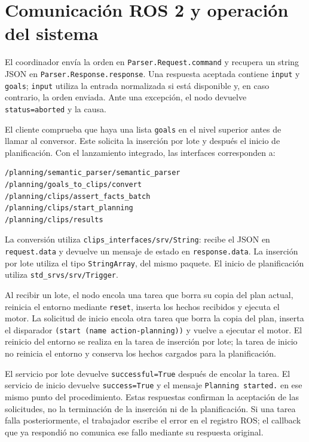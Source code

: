 \section{Comunicación ROS 2 y operación del sistema}

El coordinador envía la orden en \texttt{Parser.\allowbreak Request.\allowbreak command} y
recupera un string JSON en \texttt{Parser.\allowbreak Response.\allowbreak response}.
Una respuesta aceptada contiene \texttt{input} y \texttt{goals};
\texttt{input} utiliza la entrada normalizada si está disponible y,
en caso contrario, la orden enviada. Ante una excepción, el nodo
devuelve \texttt{status=aborted} y la causa.

El cliente comprueba que haya una lista \texttt{goals} en el nivel
superior antes de llamar al conversor. Este solicita la inserción por
lote y después el inicio de planificación. Con el lanzamiento integrado,
las interfaces corresponden a:

\begin{verbatim}
/planning/semantic_parser/semantic_parser
/planning/goals_to_clips/convert
/planning/clips/assert_facts_batch
/planning/clips/start_planning
/planning/clips/results
\end{verbatim}

La conversión utiliza \texttt{clips\_\allowbreak interfaces/\allowbreak srv/\allowbreak String}:
recibe el JSON en \texttt{request.data} y devuelve un mensaje de
estado en \texttt{response.data}. La inserción por lote utiliza el
tipo \texttt{StringArray}, del mismo paquete. El inicio de
planificación utiliza \texttt{std\_\allowbreak srvs/\allowbreak srv/\allowbreak Trigger}.

Al recibir un lote, el nodo encola una tarea que borra su copia del
plan actual, reinicia el entorno mediante \texttt{reset}, inserta
los hechos recibidos y ejecuta el motor. La solicitud de inicio
encola otra tarea que borra la copia del plan, inserta el disparador
\texttt{(start (name action-\allowbreak planning))} y vuelve a ejecutar el motor.
El reinicio del entorno se realiza en la tarea de inserción por lote;
la tarea de inicio no reinicia el entorno y conserva los hechos
cargados para la planificación.

El servicio por lote devuelve \texttt{successful=True} después de
encolar la tarea. El servicio de inicio devuelve
\texttt{success=True} y el mensaje \texttt{Planning started.\allowbreak } en
ese mismo punto del procedimiento. Estas respuestas confirman la
aceptación de las solicitudes, no la terminación de la inserción ni
de la planificación. Si una tarea falla posteriormente, el trabajador
escribe el error en el registro ROS; el callback que ya respondió no
comunica ese fallo mediante su respuesta original.

